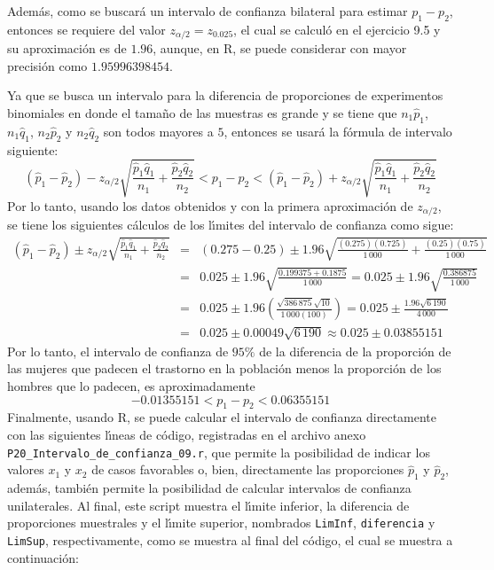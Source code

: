 \begin{solucion}
 Adem\'as, como se buscar\'a un intervalo de confianza bilateral para estimar $p_1 - p_2$, entonces se requiere del valor $z_{\alpha/2} = z_{0.025}$, el cual se calcul\'o en el ejercicio 9.5 y su aproximaci\'on es de $1.96$, aunque, en R, se puede considerar con mayor precisi\'on como $1.95996398454$.
 \par 
 Ya que se busca un intervalo para la diferencia de proporciones de experimentos binomiales en donde el tama\~no de las muestras es grande y se tiene que $n_1\hat{p}_1$, $n_1\hat{q}_1$, $n_2\hat{p}_2$ y $n_2\hat{q}_2$ son todos mayores a $5$, entonces se usar\'a la f\'ormula de intervalo siguiente:
 \begin{equation*}
  \left( \hat{p}_1 - \hat{p}_2 \right) - z_{\alpha/2}\sqrt{\frac{\hat{p}_1\hat{q}_1}{n_1} + \frac{\hat{p}_2\hat{q}_2}{n_2}} < p_1 - p_2 < \left( \hat{p}_1 - \hat{p}_2 \right) + z_{\alpha/2}\sqrt{\frac{\hat{p}_1\hat{q}_1}{n_1} + \frac{\hat{p}_2\hat{q}_2}{n_2}}
 \end{equation*}
 Por lo tanto, usando los datos obtenidos y con la primera aproximaci\'on de $z_{\alpha/2}$, se tiene los siguientes c\'alculos de los l\'{\i}mites del intervalo de confianza como sigue:
 \begin{eqnarray*}
  \left( \hat{p}_1 - \hat{p}_2 \right) \pm z_{\alpha/2}\sqrt{\frac{\hat{p}_1\hat{q}_1}{n_1} + \frac{\hat{p}_2\hat{q}_2}{n_2}} & = & ( 0.275 - 0.25 ) \pm 1.96\sqrt{\frac{(0.275)(0.725)}{1\,000} + \frac{(0.25)(0.75)}{1\,000}} \\
  & = & 0.025 \pm 1.96\sqrt{\frac{0.199375 + 0.1875}{1\,000}} = 0.025 \pm 1.96\sqrt{\frac{0.386875}{1\,000}} \\
  & = & 0.025 \pm 1.96\left( \frac{\sqrt{386\,875}\sqrt{10}}{1\,000(100)} \right) = 0.025 \pm \frac{1.96\sqrt{6\,190}}{4\,000} \\
  & = & 0.025 \pm 0.00049\sqrt{6\,190} \approx 0.025 \pm 0.03855151
 \end{eqnarray*}
 Por lo tanto, el intervalo de confianza de $95\%$ de la diferencia de la proporci\'on de las mujeres que padecen el trastorno en la poblaci\'on menos la proporci\'on de los hombres que lo padecen, es aproximadamente
 \begin{equation*}
  -0.01355151 < p_1 - p_2 < 0.06355151
 \end{equation*}
 Finalmente, usando R, se puede calcular el intervalo de confianza directamente con las siguientes l\'{\i}neas de c\'odigo, registradas en el archivo anexo \texttt{P20\_Intervalo\_de\_confianza\_09.r}, que permite la posibilidad de indicar los valores $x_1$ y $x_2$ de casos favorables o, bien, directamente las proporciones $\hat{p}_1$ y $\hat{p}_2$, adem\'as, tambi\'en permite la posibilidad de calcular intervalos de confianza unilaterales. Al final, este script muestra el l\'{\i}mite inferior, la diferencia de proporciones muestrales y el l\'{\i}mite superior, nombrados \texttt{LimInf}, \texttt{diferencia} y \texttt{LimSup}, respectivamente, como se muestra al final del c\'odigo, el cual se muestra a continuaci\'on:

\end{solucion}
